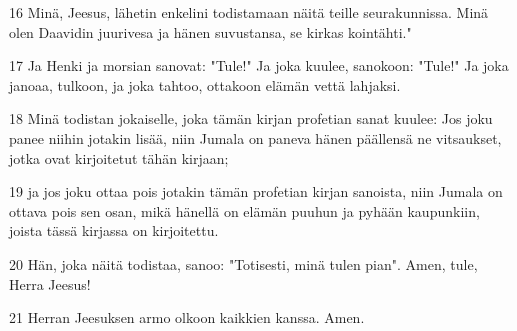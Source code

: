 \par 16 Minä, Jeesus, lähetin enkelini todistamaan näitä teille seurakunnissa. Minä olen Daavidin juurivesa ja hänen suvustansa, se kirkas kointähti."
\par 17 Ja Henki ja morsian sanovat: "Tule!" Ja joka kuulee, sanokoon: "Tule!" Ja joka janoaa, tulkoon, ja joka tahtoo, ottakoon elämän vettä lahjaksi.
\par 18 Minä todistan jokaiselle, joka tämän kirjan profetian sanat kuulee: Jos joku panee niihin jotakin lisää, niin Jumala on paneva hänen päällensä ne vitsaukset, jotka ovat kirjoitetut tähän kirjaan;
\par 19 ja jos joku ottaa pois jotakin tämän profetian kirjan sanoista, niin Jumala on ottava pois sen osan, mikä hänellä on elämän puuhun ja pyhään kaupunkiin, joista tässä kirjassa on kirjoitettu.
\par 20 Hän, joka näitä todistaa, sanoo: "Totisesti, minä tulen pian". Amen, tule, Herra Jeesus!
\par 21 Herran Jeesuksen armo olkoon kaikkien kanssa. Amen.


